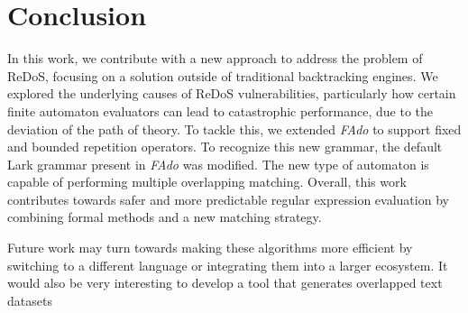 \chapter{Conclusion}
In this work, we contribute with a new approach to address the problem of \ac{ReDoS}, focusing on a solution outside of traditional backtracking engines.
We explored the underlying causes of ReDoS vulnerabilities, particularly how certain finite automaton evaluators can lead to catastrophic performance, due to the deviation of the path of theory. To tackle this, we extended \textit{FAdo} to support fixed and bounded repetition operators. To recognize this new grammar, the default Lark grammar present in \textit{FAdo} was modified. The new type of automaton is capable of performing multiple overlapping matching.
Overall, this work contributes towards safer and more predictable regular expression evaluation by combining formal methods and a new matching strategy.

Future work may turn towards making these algorithms more efficient by switching to a different language or integrating them into a larger ecosystem. It would also be very interesting to develop a tool that generates overlapped text datasets


